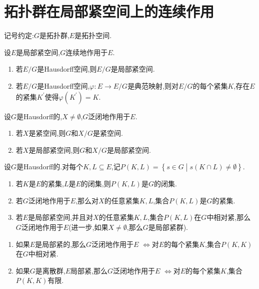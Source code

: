\section{拓扑群在局部紧空间上的连续作用}

记号约定:$G$是拓扑群,$E$是拓扑空间.

\begin{proposition}{}{}
	设$E$是局部紧空间,$G$连续地作用于$E$.
	\begin{enumerate}
		\item 若$E/G$是Hausdorff空间,则$E/G$是局部紧空间.
		\item 若$E/G$是Hausdorff空间,$\varphi:E\to E/G$是典范映射,则对$E/G$的每个紧集$K$,存在$E$的紧集$K^{\prime}$使得$\varphi\left(K^{\prime}\right)=K$.
	\end{enumerate}
\end{proposition}

\begin{proposition}{}{}
	设$G$是Hausdorff的,$X\neq\emptyset$,$G$泛闭地作用于$E$.
	\begin{enumerate}
		\item 若$X$是紧空间,则$G$和$X/G$是紧空间.
		\item 若$X$是局部紧空间,则$G$和$X/G$是局部紧空间.
	\end{enumerate}
\end{proposition}

\begin{theorem}{}{}
	设$G$是Hausdorff的.对每个$K,L\subseteq E$,记$P\left(K,L\right)=\left\{s\in G\middle|s\left(K\cap L\right)\neq\emptyset\right\}$.
	\begin{enumerate}
		\item 若$K$是$E$的紧集,$L$是$E$的闭集,则$P\left(K,L\right)$是$G$的闭集.
		\item 若$G$泛闭地作用于$E$,那么对$X$的任意紧集$K,L$,集合$P\left(K,L\right)$是$G$的紧集.
		\item 若$E$是局部紧空间,并且对$X$的任意紧集$K,L$,集合$P\left(K,L\right)$在$G$中相对紧,那么$G$泛闭地作用于$E$(进一步,如果$X\neq\emptyset$,那么$G$是局部紧群).
	\end{enumerate}
\end{theorem}

\begin{remark}{}{}
	\begin{enumerate}
		\item 如果$E$是局部紧的,那么$G$泛闭地作用于$E$ $\iff$对$E$的每个紧集$K$,集合$P\left(K,K\right)$在$G$中相对紧.
		\item 如果$G$是离散群,$E$局部紧,那么$G$泛闭地作用于$E$ $\iff$对$E$的每个紧集$K$,集合$P\left(K,K\right)$有限.
	\end{enumerate}
\end{remark}

